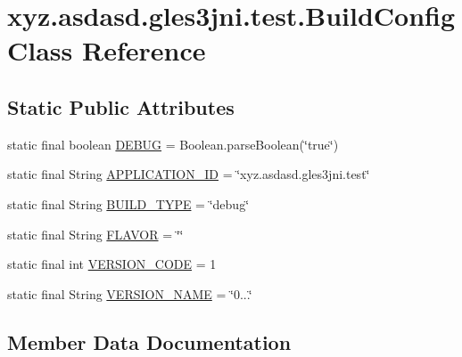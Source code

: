 \hypertarget{classxyz_1_1asdasd_1_1gles3jni_1_1test_1_1_build_config}{}\section{xyz.\+asdasd.\+gles3jni.\+test.\+Build\+Config Class Reference}
\label{classxyz_1_1asdasd_1_1gles3jni_1_1test_1_1_build_config}
\subsection*{Static Public Attributes}
\begin{DoxyCompactItemize}
\item 
static final boolean \hyperlink{classxyz_1_1asdasd_1_1gles3jni_1_1test_1_1_build_config_a3ff2e3cdd6cdc3293a0d914e8faa5cd0}{D\+E\+B\+UG} = Boolean.\+parse\+Boolean(\char`\"{}true\char`\"{})
\item 
static final String \hyperlink{classxyz_1_1asdasd_1_1gles3jni_1_1test_1_1_build_config_a3686c111004ea4fe76db20da36f79b99}{A\+P\+P\+L\+I\+C\+A\+T\+I\+O\+N\+\_\+\+ID} = \char`\"{}xyz.\+asdasd.\+gles3jni.\+test\char`\"{}
\item 
static final String \hyperlink{classxyz_1_1asdasd_1_1gles3jni_1_1test_1_1_build_config_a55bcf5980e4651d43e497016dbd2a392}{B\+U\+I\+L\+D\+\_\+\+T\+Y\+PE} = \char`\"{}debug\char`\"{}
\item 
static final String \hyperlink{classxyz_1_1asdasd_1_1gles3jni_1_1test_1_1_build_config_a1515c85b9e4601797ad6645c1e57131c}{F\+L\+A\+V\+OR} = \char`\"{}\char`\"{}
\item 
static final int \hyperlink{classxyz_1_1asdasd_1_1gles3jni_1_1test_1_1_build_config_a043299a649d62a3d92ce66920400210c}{V\+E\+R\+S\+I\+O\+N\+\_\+\+C\+O\+DE} = 1
\item 
static final String \hyperlink{classxyz_1_1asdasd_1_1gles3jni_1_1test_1_1_build_config_a385fa8db7539f1db7c0880dd478d795e}{V\+E\+R\+S\+I\+O\+N\+\_\+\+N\+A\+ME} = \char`\"{}0...\char`\"{}
\end{DoxyCompactItemize}


\subsection{Member Data Documentation}
\mbox{\label{classxyz_1_1asdasd_1_1gles3jni_1_1test_1_1_build_config_a3686c111004ea4fe76db20da36f79b99}} 
